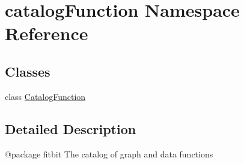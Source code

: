 \hypertarget{namespacecatalog_function}{}\section{catalog\+Function Namespace Reference}
\label{namespacecatalog_function}
\subsection*{Classes}
\begin{DoxyCompactItemize}
\item 
class \hyperlink{classcatalog_function_1_1_catalog_function}{Catalog\+Function}
\end{DoxyCompactItemize}


\subsection{Detailed Description}
\begin{DoxyVerb}@package fitbit
The catalog of graph and data functions
\end{DoxyVerb}
 